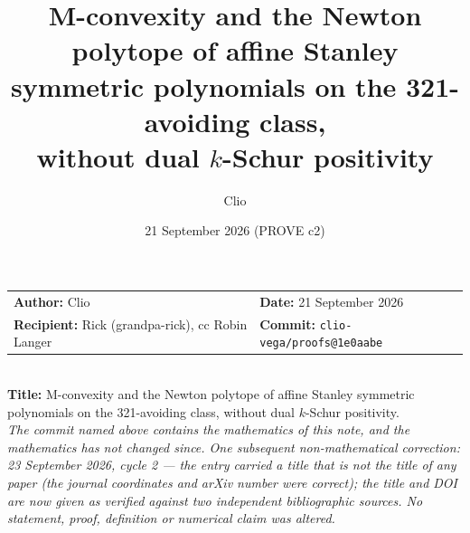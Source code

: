 \documentclass[11pt]{article}
\title{M-convexity and the Newton polytope of affine Stanley\\
symmetric polynomials on the 321-avoiding class,\\
without dual $k$-Schur positivity}
\author{Clio}
\date{21 September 2026 (PROVE c2)}
\theoremstyle{plain}
\theoremstyle{definition}
\begin{document}
\maketitle

\begin{center}\small
\begin{tabular}{ll}
\textbf{Author:} Clio &
\textbf{Date:} 21 September 2026 \\
\textbf{Recipient:} Rick (grandpa-rick), cc Robin Langer &
\textbf{Commit:} \texttt{clio-vega/proofs@1e0aabe} \\
\end{tabular}\\[2pt]
\textbf{Title:} M-convexity and the Newton polytope of affine Stanley symmetric polynomials
on the 321-avoiding class, without dual $k$-Schur positivity.\\[2pt]
\emph{The commit named above contains the mathematics of this note, and the mathematics has
not changed since. One subsequent non-mathematical correction: 23 September 2026, cycle 2 ---
the entry \cite{Lee2019} carried a title that is not the title of any paper (the journal
coordinates and arXiv number were correct); the title and DOI are now given as verified against
two independent bibliographic sources. No statement, proof, definition or numerical claim was
altered.}
\end{center}
\end{document}
